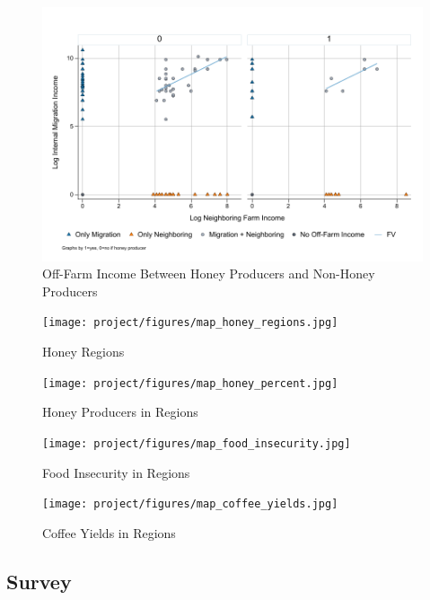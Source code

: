 \documentclass[../main.tex]{subfiles}
\begin{document}
\begin{figure}[h!]
    \centering
    \caption{Off-Farm Income Between Honey Producers and Non-Honey Producers}
    \label{fig:graph_income_other}    \includegraphics[width=.9\textwidth]{project/figures/pdf/graph_income_other.pdf}
\end{figure}

\begin{figure}[h!]
    \centering
    \caption{Honey Regions}
    \label{fig:map_honey_regions}    \texttt{[image: project/figures/map\_honey\_regions.jpg]}
\end{figure}

\begin{figure}[h!]
    \centering
    \caption{Honey Producers in Regions}
    \label{fig:map_honey_percent}    \texttt{[image: project/figures/map\_honey\_percent.jpg]}
\end{figure}

\begin{figure}[h!]
    \centering
    \caption{Food Insecurity in Regions}
    \label{fig:map_food_insecurity}   \texttt{[image: project/figures/map\_food\_insecurity.jpg]}
\end{figure}

\begin{figure}[h!]
    \centering
    \caption{Coffee Yields in Regions}
    \label{fig:map_coffee_yields}    \texttt{[image: project/figures/map\_coffee\_yields.jpg]}
\end{figure}


\subsection{Survey}


\end{document}
